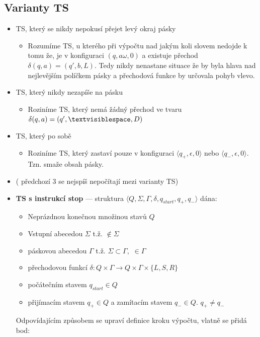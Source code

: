 \documentclass[10pt,a4paper]{article}
\theoremstyle{note}
\begin{document}
	\subsection{Varianty TS}
		\begin{itemize}
			\item TS, který se nikdy nepokusí přejet levý okraj pásky
				\begin{itemize}
					\item Rozumíme TS, u kterého při výpočtu nad jakým koli slovem nedojde k tomu že, je v konfiguraci
						$(q,a\omega,0)$ a existuje přechod $\delta(q,a) = (q',b,L).$  Tedy nikdy nenastane situace
						že by byla hlava nad nejlevějším políčkem pásky a přechodová funkce by určovala pohyb 								vlevo.
				\end{itemize}
			\item TS, který nikdy nezapíše na pásku \textvisiblespace
				\begin{itemize}
					\item Roziníme TS, který nemá žádný přechod ve tvaru $\delta(q,a) = (q',\textvisiblespace,D)$
				\end{itemize}
			\item TS, který po sobě 
				\begin{itemize}
					\item Roziníme TS, který zastaví pouze v konfiguraci $\langle q_{+}, \epsilon, 0 \rangle$
						nebo $\langle q_{-}, \epsilon, 0 \rangle$. Tzn. smaže obsah pásky.
				\end{itemize}
			\item ( předchozí 3 se nejspíš nepočítají mezi varianty TS)
			\item \textbf{TS s instrukcí stop} --- struktura  $\langle Q, \Sigma, \Gamma, \delta, q_{start}, q_{+}, q_{-} \rangle $
								dána:
				\begin{itemize}
					\item Neprázdnou konečnou množinou stavů $Q$
					\item Vstupní abecedou  $\Sigma$ t.ž. \textvisiblespace $ \notin \Sigma$
					\item páskovou abecedou $\Gamma$ t.ž. $\Sigma \subset \Gamma,$ \textvisiblespace $\in  \Gamma $
					\item přechodovou funkcí $\delta : Q \times  \Gamma \rightarrow Q \times \Gamma \times \{L, S, R \} $
					\item počátečním stavem $q_{start} \in Q$
					\item přijímacím stavem $q_{+} \in Q $ a zamítacím stavem $q_{-} \in Q.$ $q_{+} \neq q_{-}$
				\end{itemize}
				Odpovídajícím způsobem se upraví definice kroku výpočtu, vlatně se přidá bod:


\end{itemize}
\end{document}
